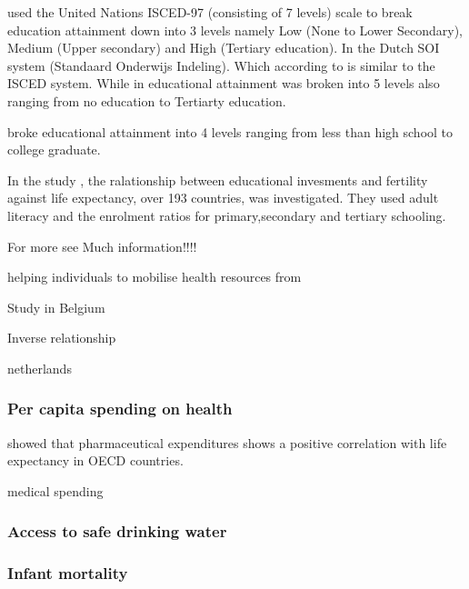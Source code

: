 \documentclass[12pt,a4paper]{article}
\begin{document}
\cite{Luy2019} used the United Nations ISCED-97 (consisting of 7 levels) scale to break education attainment down into 3 levels namely Low (None to Lower Secondary), Medium (Upper secondary) and High (Tertiary education). In \cite{VanKippersluis2009} the Dutch SOI system (Standaard Onderwijs Indeling). Which according to \cite{VanKippersluis2009} is similar to the ISCED system. While in \cite{Deboosere2009} educational attainment was broken into 5 levels also ranging from no education to Tertiarty education. 

\cite{Kaplan2015} broke educational attainment into 4 levels ranging from less than high school to college graduate.

In the study \cite{Bulled2010}, the ralationship between educational invesments and fertility against life expectancy, over 193 countries, was investigated. They used adult literacy and the enrolment ratios for primary,secondary and tertiary schooling.


For more see \cite{Montez2015} Much information!!!!









helping individuals to mobilise health resources \cite{Elo1996} from \cite{Deboosere2009}





Study in Belgium \cite{Deboosere2009}


Inverse relationship  \cite{Hoque2019}

netherlands \cite{VanKippersluis2009}

\cite{VanBaal2016a}

\subsubsection{Per capita spending on health}

\cite{Shaw2005} showed that pharmaceutical expenditures shows a positive correlation with life expectancy in OECD countries.

medical spending \cite{Cutler2006}

\subsubsection{Access to safe drinking water}

\subsubsection{Infant mortality}
\end{document}
